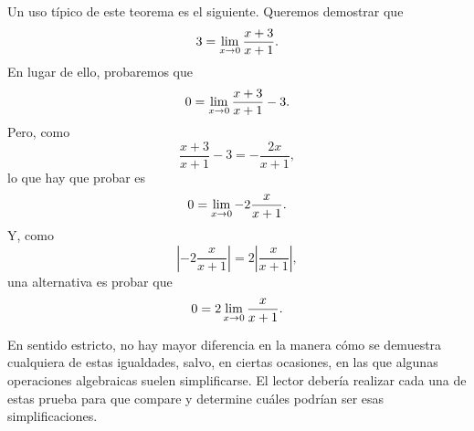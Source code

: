 Un uso típico de este teorema es el siguiente. Queremos demostrar que
\[
3 = \limjc{\frac{x + 3}{x + 1}}{x}{0}.
\]
En lugar de ello, probaremos que
\[
0 = \limjc{\frac{x + 3}{x + 1} - 3}{x}{0}.
\]
Pero, como
\[
\frac{x + 3}{x + 1} - 3 = -\frac{2x}{x + 1},
\]
lo que hay que probar es
\[
0 = \limjc{-2\frac{x}{x + 1}}{x}{0}.
\]
Y, como
\[
\left\lvert-2\frac{x}{x + 1}\right\rvert = 2\left\lvert\frac{x}{x + 1}\right\rvert,
\]
una alternativa es probar que
\[
0 = 2\limjc{\frac{x}{x + 1}}{x}{0}.
\]

En sentido estricto, no hay mayor diferencia en la manera cómo se demuestra cualquiera de estas
igualdades, salvo, en ciertas ocasiones, en las que algunas operaciones algebraicas suelen
simplificarse. El lector debería realizar cada una de estas prueba para que compare y determine
cuáles podrían ser esas simplificaciones.

